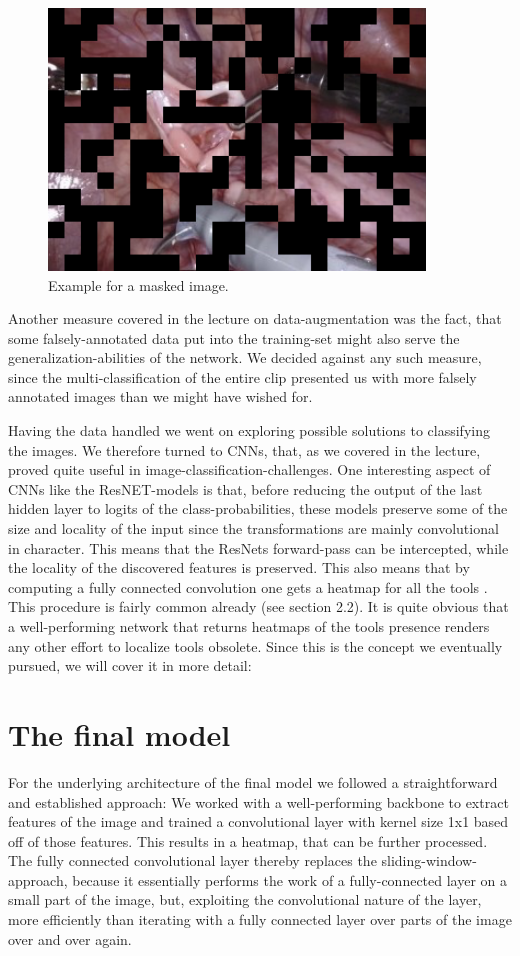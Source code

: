\begin{figure}[H]
	\centering
	\includegraphics[width=10cm]{3_methodology/masked}
	\caption{Example for a masked image.}
	\label{fig:Masked}
\end{figure}


Another measure covered in the lecture on data-augmentation was the fact, that some falsely-annotated data put into the training-set might also serve the generalization-abilities of the network. We decided against any such measure, since the multi-classification of the entire clip presented us with more falsely annotated images than we might have wished for.

Having the data handled we went on exploring possible solutions to classifying the images. We therefore turned to CNNs, that, as we covered in the lecture, proved quite useful in image-classification-challenges. One interesting aspect of CNNs like the ResNET-models is that, before reducing the output of the last hidden layer to logits of the class-probabilities, these models preserve some of the size and locality of the input since the transformations are mainly convolutional in character. This means that the ResNets forward-pass can be intercepted, while the locality of the discovered features is preserved.
This also means that by computing a fully connected convolution one gets a heatmap for all the tools \citep{classpeak}. This procedure is fairly common already (see section 2.2). It is quite obvious that a well-performing network that returns heatmaps of the tools presence renders any other effort to localize tools obsolete. Since this is the concept we eventually pursued, we will cover it in more detail:

\section{The final model}
For the underlying architecture of the final model we followed a straightforward and established approach: We worked with a well-performing backbone to extract features of the image and trained a convolutional layer with kernel size 1x1 based off of those features. This results in a heatmap, that can be further processed.
The fully connected convolutional layer thereby replaces the sliding-window-approach, because it essentially performs the work of a fully-connected layer on a small part of the image, but, exploiting the convolutional nature of the layer, more efficiently than iterating with a fully connected layer over parts of the image over and over again. 


